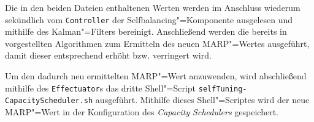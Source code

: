 Die in den beiden Dateien enthaltenen Werten werden im Anschluss wiederum sekündlich vom \texttt{Controller} der Selfbalancing"=Komponente ausgelesen und mithilfe des Kalman"=Filters bereinigt.
Anschließend werden die bereits in \cite{zhang2016} vorgestellten Algorithmen zum Ermitteln des neuen \ac{MARP}"=Wertes ausgeführt, damit dieser entsprechend erhöht bzw. verringert wird.

Um den dadurch neu ermittelten \ac{MARP}"=Wert anzuwenden, wird abschließend mithilfe des \texttt{Effectuator}s das dritte Shell"=Script \texttt{selfTuning-CapacityScheduler.sh} ausgeführt.
Mithilfe dieses Shell"=Scriptes wird der neue MARP"=Wert in der Konfiguration des \emph{Capacity Schedulers} gespeichert.
